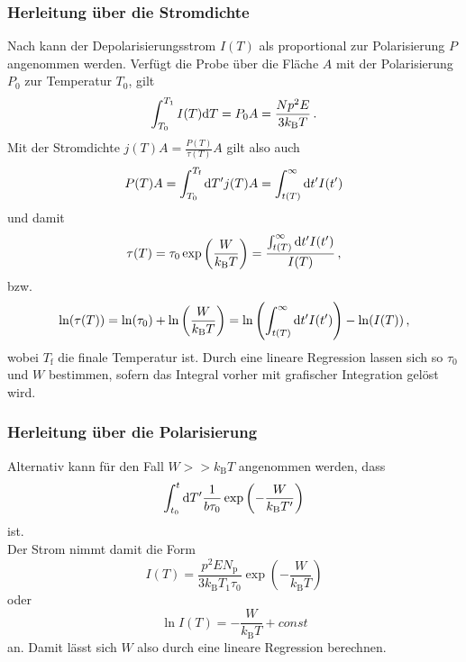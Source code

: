 \subsubsection{Herleitung über die Stromdichte}

Nach \cite[S. ~4]{fuller} kann der Depolarisierungsstrom $I(T)$ als proportional zur Polarisierung $P$ angenommen werden.
Verfügt die Probe über die Fläche $A$ mit der Polarisierung $P_0$ zur Temperatur $T_0$, gilt
\begin{equation*}
    \int^{T_1}_{T_0} I(T) \mathrm{d} T = P_0 A = \frac{N p^2 E}{3 k_\text{B}T} \,.
\end{equation*}
Mit der Stromdichte $j(T) A = \frac{P(T)}{\tau(T)} A$ gilt also auch
\begin{equation*}
    P(T) A = \int^{T_\text{f}}_{T_0} \mathrm{d} T' j(T) A  = \int^\infty_{t(T)} \mathrm{d} t' I(t')
\end{equation*}
und damit
\begin{equation}
    \tau(T) = \tau_0 \exp \left(\frac{W}{k_\text{B} T} \right) =  \frac{\int^\infty_{t(T)} \mathrm{d} t' I(t')}{I(T)} \,,
    \label{eq:relaxozeitpol}
\end{equation}
bzw.
\begin{equation}
    \ln(\tau(T)) = \ln(\tau_0) + \ln\left(\frac{W}{k_\text{B} T} \right) =  \ln \left(\int^\infty_{t(T)} \mathrm{d} t' I(t') \right) - \ln (I(T)) \,,
    \label{eq:lnrelaxozeitpol}
\end{equation}
wobei $T_\text{f}$ die finale Temperatur ist.
Durch eine lineare Regression lassen sich so $\tau_0$ und $W$ bestimmen, sofern das Integral vorher mit grafischer Integration gelöst wird.

\subsubsection{Herleitung über die Polarisierung}

Alternativ kann für den Fall $W >> k_\text{B} T$ angenommen werden, dass
\begin{equation*}
    \int^t_{t_0} \mathrm{d} T' \frac{1}{b \tau_0}  \exp \left(-\frac{W}{k_\text{B} T'} \right)
\end{equation*}
ist. \\
Der Strom nimmt damit die Form
\begin{equation*}
    I(T) = \frac{p^2 E N_\text{p}}{3 k_\text{B} T_1 \tau_0} \exp(-\frac{W}{k_\text{B} T}) 
\end{equation*}
oder
\begin{equation}
    \ln I(T) = - \frac{W}{k_\text{B} T} + const
    \label{eq:lnStrom}
\end{equation}
an.
Damit lässt sich $W$ also durch eine lineare Regression berechnen.



